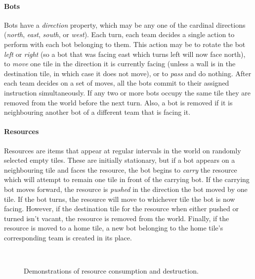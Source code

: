 \documentclass[a4paper,10pt]{article}
\begin{document}
\paragraph{Bots}
Bots have a \emph{direction} property, which may be any one of the cardinal directions (\emph{north}, \emph{east}, \emph{south}, or \emph{west}). Each turn, each team decides a single action to perform with each bot belonging to them. This action may be to rotate the bot \emph{left} or \emph{right} (so a bot that was facing east which turns left will now face north), to \emph{move} one tile in the direction it is currently facing (unless a wall is in the destination tile, in which case it does not move), or to \emph{pass} and do nothing. After each team decides on a set of moves, all the bots commit to their assigned instruction simultaneously. If any two or more bots occupy the same tile they are removed from the world before the next turn. Also, a bot is removed if it is neighbouring another bot of a different team that is facing it.


\paragraph{Resources}
Resources are items that appear at regular intervals in the world on randomly selected empty tiles. These are initially stationary, but if a bot appears on a neighbouring tile and faces the resource, the bot begins to \emph{carry} the resource which will attempt to remain one tile in front of the carrying bot. If the carrying bot moves forward, the resource is \emph{pushed} in the direction the bot moved by one tile. If the bot turns, the resource will move to whichever tile the bot is now facing. However, if the destination tile for the resource when either pushed or turned isn't vacant, the resource is removed from the world. Finally, if the resource is moved to a home tile, a new bot belonging to the home tile's corresponding team is created in its place.

\begin{figure}[ht]
  \centering
  \mbox{
    \quad
  }
  \caption{Demonstrations of resource consumption and destruction.}
  \vspace{-5mm}
\end{figure}
\end{document}
